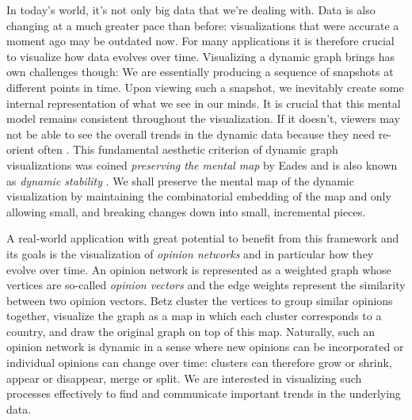 
In today's world, it's not only big data that we're dealing with. Data is also changing at a much greater pace than before: visualizations that were accurate a moment ago may be outdated now. For many applications it is therefore crucial to visualize how data evolves over time. Visualizing a dynamic graph brings has own challenges though: We are essentially producing a sequence of snapshots at different points in time. Upon viewing such a snapshot, we inevitably create some internal representation of what we see in our minds. It is crucial that this mental model remains consistent throughout the visualization. If it doesn't, viewers may not be able to see the overall trends in the dynamic data because they need re-orient often \cite{bohringer1990using} \cite{lee2006mental} \cite{purchase2006important}. This fundamental aesthetic criterion of dynamic graph visualizations was coined \emph{preserving the mental map} by Eades \etal{} \cite{eades1991preserving} \cite{misue1995layout} and is also known as \emph{dynamic stability} \cite{diehl2002graphs}. We shall preserve the mental map of the dynamic visualization by maintaining the combinatorial embedding of the map and only allowing small, and breaking changes down into small, incremental pieces.

A real-world application with great potential to benefit from this framework and its goals is the visualization of \emph{opinion networks} \cite{betz2019applying} and in particular how they evolve over time. An opinion network is represented as a weighted graph whose vertices are so-called \emph{opinion vectors} and the edge weights represent the similarity between two opinion vectors. Betz \etal{} cluster the vertices to group similar opinions together, visualize the graph as a map in which each cluster corresponds to a country, and draw the original graph on top of this map. Naturally, such an opinion network is dynamic in a sense where new opinions can be incorporated or individual opinions can change over time: clusters can therefore grow or shrink, appear or disappear, merge or split. We are interested in visualizing such processes effectively to find and communicate important trends in the underlying data.
